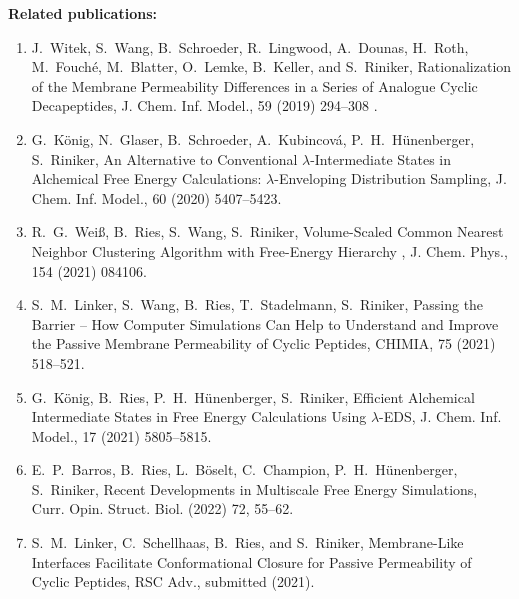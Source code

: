 \newpage
\noindent \textbf{Related publications:}
\begin{enumerate}
    \item J.\ Witek, S.\ Wang, B.\ Schroeder, R.\ Lingwood, A.\ Dounas, H.\ Roth, M.\ Fouché, M.\ Blatter, O.\ Lemke, B.\ Keller, and S.\ Riniker, Rationalization of the Membrane Permeability Differences in a Series of Analogue Cyclic Decapeptides, {J. Chem. Inf. Model.}, {59} (2019) 294--308 .
    \item  G.\ K\"onig, N.\ Glaser, B.\ Schroeder, A.\ Kubincová, P.\ H.\ H\"unenberger, S.\ Riniker, An Alternative to Conventional $\lambda$-Intermediate States in Alchemical Free Energy Calculations: $\lambda$-Enveloping Distribution Sampling, {J. Chem. Inf. Model.}, {60} (2020) 5407--5423.
    \item R.\ G.\ Wei\ss, B.\ Ries, S.\ Wang, S.\ Riniker, Volume-Scaled Common Nearest Neighbor Clustering Algorithm with Free-Energy Hierarchy , {J. Chem. Phys.}, {154} (2021) 084106.
    \item S.\ M.\ Linker, S.\ Wang, B.\ Ries, T.\ Stadelmann, S.\ Riniker, Passing the Barrier – How Computer Simulations Can Help to Understand and Improve the Passive Membrane Permeability of Cyclic Peptides, {CHIMIA}, {75} (2021) 518--521.
    \item G.\ K\"onig, B.\ Ries, P.\ H.\ H\"unenberger, S.\ Riniker, Efficient Alchemical Intermediate States in Free Energy Calculations Using  $\lambda$-EDS, {J. Chem. Inf. Model.}, {17} (2021) 5805--5815.
    \item E.\ P.\ Barros, B.\ Ries, L.\ B\"oselt, C.\ Champion, P.\ H.\ H\"unenberger, S.\ Riniker, Recent Developments in Multiscale Free Energy Simulations, {Curr. Opin. Struct. Biol.} (2022) {72}, 55--62.
    \item S.\ M.\ Linker, C.\ Schellhaas, B.\ Ries, and S.\ Riniker, Membrane-Like Interfaces Facilitate Conformational Closure for Passive Permeability of Cyclic Peptides, {RSC Adv.}, submitted (2021).

\end{enumerate}
